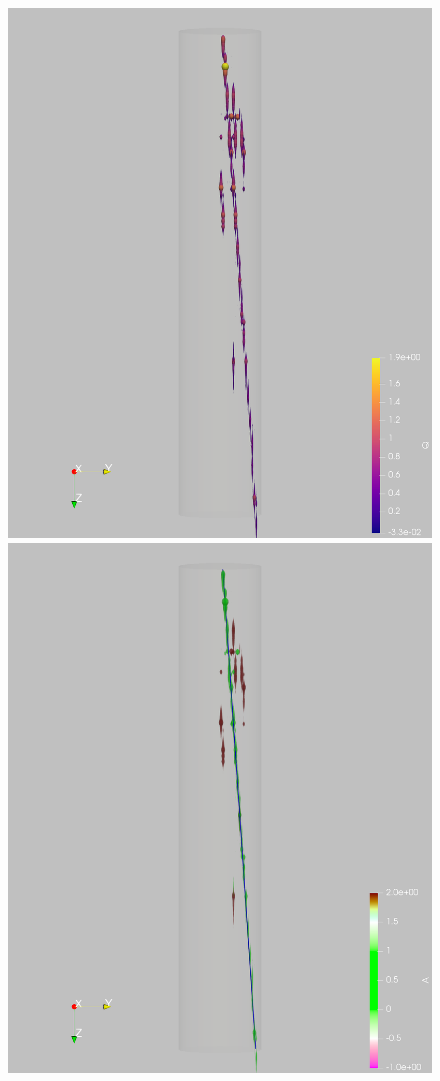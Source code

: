 \documentclass[a4paper]{article}
\begin{document}
\begin{figure}[htb]
	\centering
	\includegraphics[viewport=600 0 1000 2000, clip, height=\textwidth, angle=90]{event967_pulses_q} \\
	\includegraphics[viewport=600 0 1000 2000, clip, height=\textwidth, angle=90]{event967_pulses_a_pca} \\

\end{figure}
\end{document}
